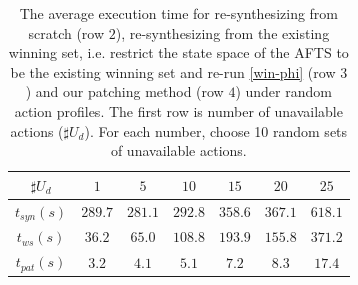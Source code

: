 \begin{table}
	\centering
	\caption{The average execution time for re-synthesizing from scratch (row $ 2 $), re-synthesizing from the existing winning set, i.e. restrict the state space of the AFTS to be the existing winning set and re-run \eqref{win-phi} (row $ 3 $) and our patching method (row $ 4 $) under random action profiles. The first row is number of unavailable actions ($ \sharp U_d $). For each number, choose 10 random sets of unavailable actions.}
	\begin{tabular}{ccccccc}
		\hline 
		$ \sharp U_d $ & $ 1 $ &$ 5 $ & $ 10 $ & $ 15 $ & $ 20 $ & $ 25 $ \\ 
		\hline 
		$ t_{syn}(s) $ & $ 289.7 $ & $ 281.1 $ & $ 292.8 $ & $ 358.6 $ &  $ 367.1 $ & $ 618.1 $ \\
		$t_{ws} (s)$ & $ 36.2 $ & $ 65.0 $ & $ 108.8 $ & $ 193.9 $ & $ 155.8 $ & $ 371.2 $\\
		$ t_{pat}(s)$ & $ 3.2 $ & $ 4.1 $ & $ 5.1 $ & $ 7.2 $ & $ 8.3 $ & $ 17.4 $ \\ 
		\hline 
	\end{tabular} 
	\label{tab: exper2}
\end{table}

